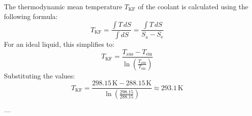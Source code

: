 The thermodynamic mean temperature \( T_{\text{KF}} \) of the coolant is calculated using the following formula:  
\[
T_{\text{KF}} = \frac{\int T \, dS}{\int dS} = \frac{\int T \, dS}{S_{\text{a}} - S_{\text{e}}}
\]  
For an ideal liquid, this simplifies to:  
\[
T_{\text{KF}} = \frac{T_{\text{aus}} - T_{\text{ein}}}{\ln\left(\frac{T_{\text{aus}}}{T_{\text{ein}}}\right)}
\]  
Substituting the values:  
\[
T_{\text{KF}} = \frac{298.15 \, \text{K} - 288.15 \, \text{K}}{\ln\left(\frac{298.15}{288.15}\right)} \approx 293.1 \, \text{K}
\]  

---